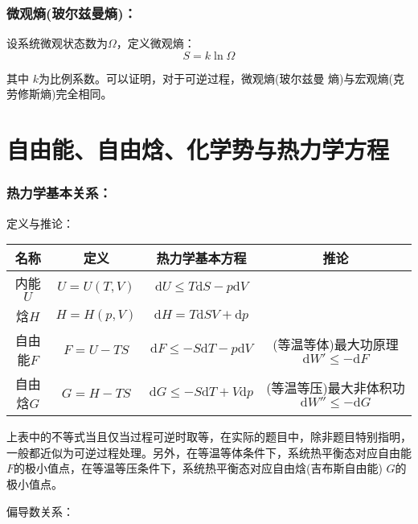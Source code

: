 \documentclass[zihao=-4,UTF8]{report}
\begin{document}
\subsubsection{微观熵(玻尔兹曼熵)：}
设系统微观状态数为$\Omega$，定义微观熵：
\begin{equation}
    S = k\ln \Omega
\end{equation}
{\par\color{gray}\small
其中 $k$为比例系数。可以证明，对于可逆过程，微观熵(玻尔兹曼 熵)与宏观熵(克劳修斯熵)完全相同。
\par}

\section{自由能、自由焓、化学势与热力学方程}

\subsubsection{热力学基本关系：}
定义与推论：
\begin{table}[H]
    \centering
    \begin{tabular}{cccc} 
    \toprule
    名称 & 定义 & 热力学基本方程 & 推论  \\
    \midrule
     内能$U$ & $U = U(T,V)$ & $\mathrm{d}U \le T\mathrm{d}S -p\mathrm{d}V $ &   \\
     焓$H$ & $H = H(p,V)$ & $\mathrm{d}H = T\mathrm{d}S V + \mathrm{d}p$ &\\
     自由能$F$ & $F = U-TS$ & $\mathrm{d}F \le -S\mathrm{d}T-p\mathrm{d}V$ & {\small(等温等体)最大功原理} $\mathrm{d}W' \le -\mathrm{d}F$  \\
    自由焓$G$ & $G = H - TS$ & $\mathrm{d}G \le -S\mathrm{d}T + V\mathrm{d}p$ & {\small(等温等压)最大非体积功} $\mathrm{d}W'' \le -\mathrm{d}G$  \\
    \bottomrule
    \end{tabular}
\end{table}
{\par\color{gray}\small
上表中的不等式当且仅当过程可逆时取等，在实际的题目中，除非题目特别指明，一般都近似为可逆过程处理。另外，在等温等体条件下，系统热平衡态对应自由能$F$的极小值点，在等温等压条件下，系统热平衡态对应自由焓(吉布斯自由能) $G$的极小值点。
\par}
偏导数关系：
\end{document}

